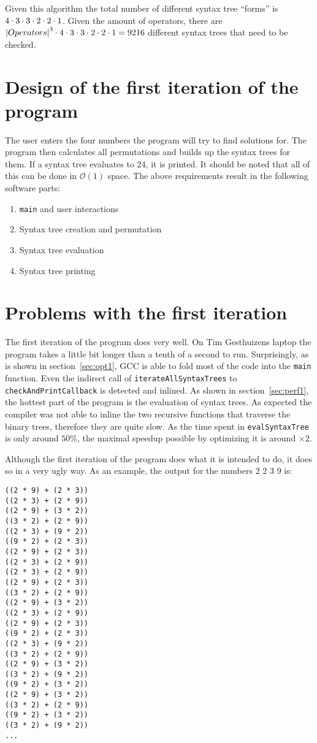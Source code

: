 \documentclass[11pt,a4paper]{article}
\newcommand{\code}[1]{\texttt{#1}}
\begin{document}
Given this algorithm the total number of different syntax tree
``forms'' is $4 \cdot 3 \cdot 3 \cdot 2 \cdot 2 \cdot 1$.
Given the amount of operators, there are ${\vert Operators \vert}^3 \cdot 4 \cdot 3 \cdot 3 \cdot 2 \cdot 2 \cdot 1 = 9216$
different syntax trees that need to be checked.

\section{Design of the first iteration of the program}

The user enters the four numbers the program will try to find solutions
for. The program then calculates all permutations and builds up the
syntax trees for them. If a syntax tree evaluates to 24, it is
printed.
It should be noted that all of this can be done in $\mathcal{O}(1)$
space.
The above requirements result in the following software parts:
\begin{enumerate}
\item \code{main} and user interactions
\item Syntax tree creation and permutation
\item Syntax tree evaluation
\item Syntax tree printing
\end{enumerate}

\section{Problems with the first iteration}

The first iteration of the program does very well. On Tim Gesthuizens
laptop the program takes a little bit longer than a tenth of a second
to run.
Surprisingly, as is shown in section~\ref{sec:opt1}, GCC is able to
fold most of the code into the \code{main} function.
Even the indirect call of \code{iterateAllSyntaxTrees} to
\code{checkAndPrintCallback} is detected and inlined.
As shown in section~\ref{sec:perf1}, the hottest part of the program
is the evaluation of syntax trees.
As expected the compiler was not able to inline the two recursive
functions that traverse the binary trees, therefore they are quite
slow.
As the time spent in \code{evalSyntaxTree} is only around $50\%$,
the maximal speedup possible by optimizing it is around $\times 2$.

Although the first iteration of the program does what it is intended to do,
it does so in a very ugly way. As an example, the output for the numbers $2$ $2$ $3$ $9$
is:
\begin{multicols}{2}
\begin{verbatim}
((2 * 9) + (2 * 3))
((2 * 3) + (2 * 9))
((2 * 9) + (3 * 2))
((3 * 2) + (2 * 9))
((2 * 3) + (9 * 2))
((9 * 2) + (2 * 3))
((2 * 9) + (2 * 3))
((2 * 3) + (2 * 9))
((2 * 3) + (2 * 9))
((2 * 9) + (2 * 3))
((3 * 2) + (2 * 9))
((2 * 9) + (3 * 2))
((2 * 3) + (2 * 9))
((2 * 9) + (2 * 3))
((9 * 2) + (2 * 3))
((2 * 3) + (9 * 2))
((3 * 2) + (2 * 9))
((2 * 9) + (3 * 2))
((3 * 2) + (9 * 2))
((9 * 2) + (3 * 2))
((2 * 9) + (3 * 2))
((3 * 2) + (2 * 9))
((9 * 2) + (3 * 2))
((3 * 2) + (9 * 2))
...
\end{verbatim}
\end{multicols}
\end{document}
